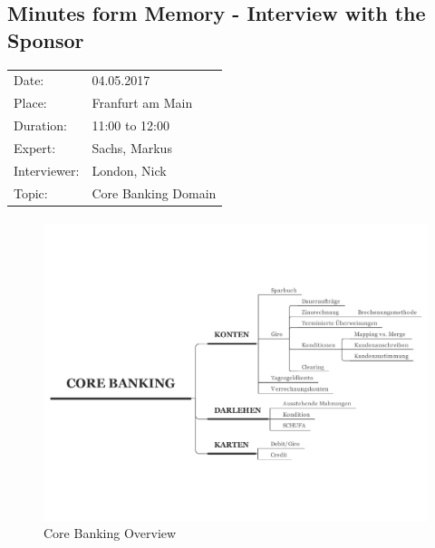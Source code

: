 \subsection*{Minutes form Memory  - Interview with the Sponsor}
\begin{tabular}{l l}
Date: & 04.05.2017 \\
Place: & Franfurt am Main \\
Duration: & 11:00 to 12:00 \\
Expert: & Sachs, Markus \\
Interviewer: & London, Nick \\
Topic: & Core Banking Domain
\end{tabular}

\paragraph{}


\begin{figure}[H]
    \centering
    \includegraphics[angle=270, width=\textwidth]{img/CoreBanking.pdf}
    \captionsetup{labelformat=empty}
    \caption[]{Core Banking Overview}
    \label{fig:cbOver}
\end{figure}